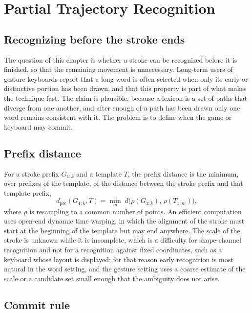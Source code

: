 \chapter{Partial Trajectory Recognition}\label{ch:partial-recognition}

\section{Recognizing before the stroke ends}

The question of this chapter is whether a stroke can be recognized before it is finished, so that the remaining movement is unnecessary. Long-term users of gesture keyboards report that a long word is often selected when only its early or distinctive portion has been drawn, and that this property is part of what makes the technique fast.\evO{} The claim is plausible, because a lexicon is a set of paths that diverge from one another, and after enough of a path has been drawn only one word remains consistent with it. The problem is to define when the game or keyboard may commit.

\section{Prefix distance}

For a stroke prefix $G_{1:k}$ and a template $T$, the prefix distance is the minimum, over prefixes of the template, of the distance between the stroke prefix and that template prefix,
\[
d_{\mathrm{pre}}(G_{1:k},T)=\min_{m}\;d\bigl(\rho(G_{1:k}),\,\rho(T_{1:m})\bigr),
\]
where $\rho$ is resampling to a common number of points. An efficient computation uses open-end dynamic time warping, in which the alignment of the stroke must start at the beginning of the template but may end anywhere. The scale of the stroke is unknown while it is incomplete, which is a difficulty for shape-channel recognition and not for a recognition against fixed coordinates, such as a keyboard whose layout is displayed; for that reason early recognition is most natural in the word setting, and the gesture setting uses a coarse estimate of the scale or a candidate set small enough that the ambiguity does not arise.

\section{Commit rule}

